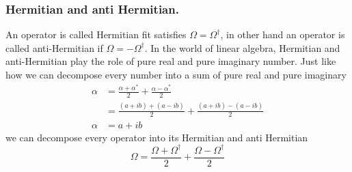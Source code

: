 \documentclass[../../../main.tex]{subfiles}
\begin{document}
\subsubsection{Hermitian and anti Hermitian.}
An operator is called Hermitian fit satisfies $\Omega=\Omega ^\dagger$, in other hand an operator is called anti-Hermitian if $\Omega=-\Omega ^\dagger$.
In the world of linear algebra, Hermitian and anti-Hermitian play the role of pure real and pure imaginary number.
Just like how we can decompose every number into a sum of pure real and pure imaginary
\begin{align*}
	\alpha & =\frac{\alpha+\alpha ^*}{2}+\frac{\alpha-\alpha ^*}{2} \\
	       & =\frac{(a+ib)+(a-ib)}{2}+\frac{(a+ib)-(a-ib)}{2}       \\
	\alpha & =a+ib
\end{align*}
we can decompose every operator into its Hermitian and anti Hermitian
\begin{equation*}
	\Omega=\frac{\Omega+\Omega ^\dagger}{2}+\frac{\Omega-\Omega ^\dagger}{2}
\end{equation*}
\end{document}
